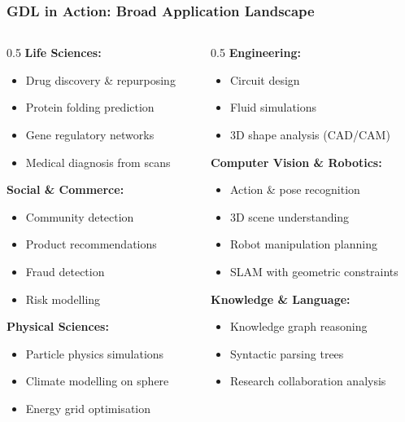 \begin{frame}[fragile]\frametitle{GDL in Action: Broad Application Landscape}

  \begin{columns}
  \begin{column}{0.5\textwidth}
  \textbf{Life Sciences:}
  \begin{itemize}
    \item Drug discovery \& repurposing
    \item Protein folding prediction
    \item Gene regulatory networks
    \item Medical diagnosis from scans
  \end{itemize}
  \textbf{Social \& Commerce:}
  \begin{itemize}
    \item Community detection
    \item Product recommendations
    \item Fraud detection
    \item Risk modelling
  \end{itemize}
  \textbf{Physical Sciences:}
  \begin{itemize}
    \item Particle physics simulations
    \item Climate modelling on sphere
    \item Energy grid optimisation
  \end{itemize}
  \end{column}
  \begin{column}{0.5\textwidth}
  \textbf{Engineering:}
  \begin{itemize}
    \item Circuit design
    \item Fluid simulations
    \item 3D shape analysis (CAD/CAM)
  \end{itemize}
  \textbf{Computer Vision \& Robotics:}
  \begin{itemize}
    \item Action \& pose recognition
    \item 3D scene understanding
    \item Robot manipulation planning
    \item SLAM with geometric constraints
  \end{itemize}
  \textbf{Knowledge \& Language:}
  \begin{itemize}
    \item Knowledge graph reasoning
    \item Syntactic parsing trees
    \item Research collaboration analysis
  \end{itemize}
  \end{column}
  \end{columns}

\end{frame}

